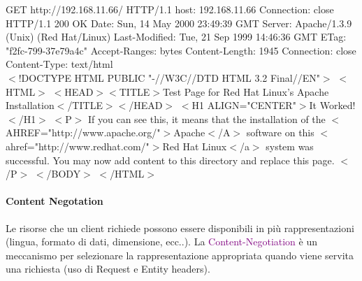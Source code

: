 \begin{mdframed}
    GET http://192.168.11.66/ HTTP/1.1\newline
    host: 192.168.11.66\newline
    Connection: close\newline
    \\
    HTTP/1.1 200 OK\newline
    Date: Sun, 14 May 2000 23:49:39 GMT\newline
    Server: Apache/1.3.9 (Unix) (Red Hat/Linux)\newline
    Last-Modified: Tue, 21 Sep 1999 14:46:36 GMT\newline
    ETag: "f2fc-799-37e79a4c"\newline
    Accept-Ranges: bytes\newline
    Content-Length: 1945\newline
    Connection: close\newline
    Content-Type: text/html\newline
    \\
    $<$!DOCTYPE HTML PUBLIC "-//W3C//DTD HTML 3.2 Final//EN"$>$\newline
    $<$HTML$>$\newline
    $<$HEAD$>$$<$TITLE$>$Test Page for Red Hat Linux's Apache Installation$<$/TITLE$>$$<$/HEAD$>$\newline
    $<$H1 ALIGN="CENTER"$>$It Worked!$<$/H1$>$\newline
    $<$P$>$\newline
    If you can see this, it means that the installation of the $<$AHREF="http://www.apache.org/"$>$Apache$<$/A$>$ software on this $<$ahref="http://www.redhat.com/"$>$Red Hat Linux$<$/a$>$ system was successful. You may now add content to this directory and replace this page.\newline
    $<$/P$>$\newline
    $<$/BODY$>$\newline
    $<$/HTML$>$\newline    
\end{mdframed}

\newpage
\paragraph{Content Negotation}
Le risorse che un client richiede possono essere disponibili in più rappresentazioni (lingua, formato di dati, dimensione, ecc..). La \textcolor{purple}{Content-Negotiation} è un meccanismo per selezionare la rappresentazione appropriata quando viene servita una richiesta (uso di Request e Entity headers).

